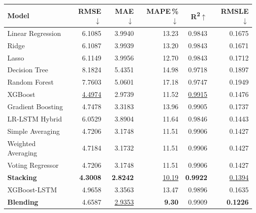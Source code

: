 \begin{tabular*}{\textwidth}{@{\extracolsep{\fill}}lrrrrr@{}}
\toprule
\textbf{Model} & \textbf{RMSE}$\downarrow$ & \textbf{MAE}$\downarrow$ & \textbf{MAPE\,\%}$\downarrow$ & \textbf{R\textsuperscript{2}}$\uparrow$ & \textbf{RMSLE}$\downarrow$ \\
\midrule
Linear Regression & 6.1085 & 3.9940 & 13.23 & 0.9843 & 0.1675 \\
Ridge & 6.1087 & 3.9939 & 13.20 & 0.9843 & 0.1671 \\
Lasso & 6.1149 & 3.9956 & 12.70 & 0.9843 & 0.1712 \\
Decision Tree & 8.1824 & 5.4351 & 14.98 & 0.9718 & 0.1897 \\
Random Forest & 7.7603 & 5.0601 & 17.18 & 0.9747 & 0.1949 \\
XGBoost & \underline{4.4974} & 2.9739 & 11.52 & \underline{0.9915} & 0.1476 \\
Gradient Boosting & 4.7478 & 3.3183 & 13.96 & 0.9905 & 0.1737 \\
LR-LSTM Hybrid & 6.0529 & 3.8904 & 11.64 & 0.9846 & 0.1443 \\
Simple Averaging & 4.7206 & 3.1748 & 11.51 & 0.9906 & 0.1427 \\
Weighted Averaging & 4.7184 & 3.1732 & 11.51 & 0.9906 & 0.1427 \\
Voting Regressor & 4.7206 & 3.1748 & 11.51 & 0.9906 & 0.1427 \\
\textbf{Stacking} & \textbf{4.3008} & \textbf{2.8242} & \underline{10.19} & \textbf{0.9922} & \underline{0.1394} \\
XGBoost-LSTM & 4.9658 & 3.3563 & 13.47 & 0.9896 & 0.1635 \\
\textbf{Blending} & 4.6587 & \underline{2.9353} & \textbf{9.30} & 0.9909 & \textbf{0.1226} \\
\bottomrule
\end{tabular*}
